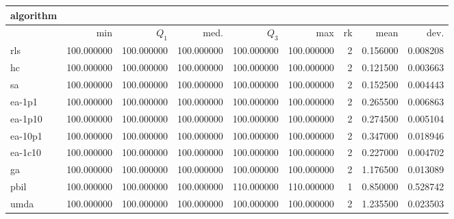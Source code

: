 \begin{tabular}{@{}l*{5}{>{{}}N{3}{0}}>{{}}N{2}{0}N{1}{3}N{1}{3}@{}}
\toprule
{algorithm} &  &  \\
\midrule
& {min} & {$Q_1$} & {med.} & {$Q_3$} & {max} & {rk} & {mean} & {dev.} \\
\midrule
rls & {\color{blue}} 100.000000 & {\color{blue}} 100.000000 & {\color{blue}} 100.000000 & 100.000000 & 100.000000 & 2 & 0.156000 & 0.008208 \\
 hc & {\color{blue}} 100.000000 & {\color{blue}} 100.000000 & {\color{blue}} 100.000000 & 100.000000 & 100.000000 & 2 & 0.121500 & 0.003663 \\
 sa & {\color{blue}} 100.000000 & {\color{blue}} 100.000000 & {\color{blue}} 100.000000 & 100.000000 & 100.000000 & 2 & 0.152500 & 0.004443 \\
 ea-1p1 & {\color{blue}} 100.000000 & {\color{blue}} 100.000000 & {\color{blue}} 100.000000 & 100.000000 & 100.000000 & 2 & 0.265500 & 0.006863 \\
 ea-1p10 & {\color{blue}} 100.000000 & {\color{blue}} 100.000000 & {\color{blue}} 100.000000 & 100.000000 & 100.000000 & 2 & 0.274500 & 0.005104 \\
 ea-10p1 & {\color{blue}} 100.000000 & {\color{blue}} 100.000000 & {\color{blue}} 100.000000 & 100.000000 & 100.000000 & 2 & 0.347000 & 0.018946 \\
 ea-1c10 & {\color{blue}} 100.000000 & {\color{blue}} 100.000000 & {\color{blue}} 100.000000 & 100.000000 & 100.000000 & 2 & 0.227000 & 0.004702 \\
 ga & {\color{blue}} 100.000000 & {\color{blue}} 100.000000 & {\color{blue}} 100.000000 & 100.000000 & 100.000000 & 2 & 1.176500 & 0.013089 \\
 pbil & {\color{blue}} 100.000000 & {\color{blue}} 100.000000 & {\color{blue}} 100.000000 & {\color{blue}} 110.000000 & {\color{blue}} 110.000000 & 1 & 0.850000 & 0.528742 \\
 umda & {\color{blue}} 100.000000 & {\color{blue}} 100.000000 & {\color{blue}} 100.000000 & 100.000000 & 100.000000 & 2 & 1.235500 & 0.023503 \\
 \bottomrule
\end{tabular}
